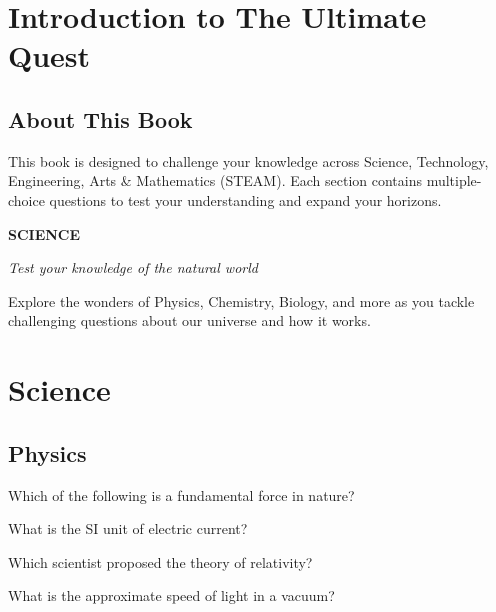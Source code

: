 \documentclass[12pt,a4paper]{book}
\renewcommand{\sectioncover}[3]{%
  \cleardoublepage
  \thispagestyle{empty}
  \begin{center}
    \vspace*{2cm}
    {\huge\bfseries\textcolor{questblue}{#1}\par}
    \vspace{0.7cm}
    {\Large\textit{#2}\par}
    \vspace{1.2cm}
    \begin{tcolorbox}[
      enhanced,
      colback=white,
      colframe=questorange,
      arc=5mm,
      boxrule=0.5mm,
      width=0.7\textwidth,
      halign=center,
      valign=center,
      height=5cm
    ]
      \begin{center}
        {\large #3\par}
      \end{center}
    \end{tcolorbox}
    \vspace{1.5cm}
  \end{center}
  \cleardoublepage
}
\begin{document}
\frontmatter

\tableofcontents

\mainmatter

\chapter{Introduction to The Ultimate Quest}
\section{About This Book}
This book is designed to challenge your knowledge across Science, Technology, Engineering, Arts \& Mathematics (STEAM). Each section contains multiple-choice questions to test your understanding and expand your horizons.

\lipsum[1]

\sectioncover{SCIENCE}{Test your knowledge of the natural world}{Explore the wonders of Physics, Chemistry, Biology, and more as you tackle challenging questions about our universe and how it works.}

\chapter{Science}
\section{Physics}

\begin{enhancedmcq}{Which of the following is a fundamental force in nature?}
\end{enhancedmcq}

\begin{enhancedmcq}[SI Units]{What is the SI unit of electric current?}
\end{enhancedmcq}

\begin{enhancedmcq}{Which scientist proposed the theory of relativity?}
\end{enhancedmcq}

\begin{enhancedmcq}[Light]{What is the approximate speed of light in a vacuum?}
\end{enhancedmcq}
\end{document}
